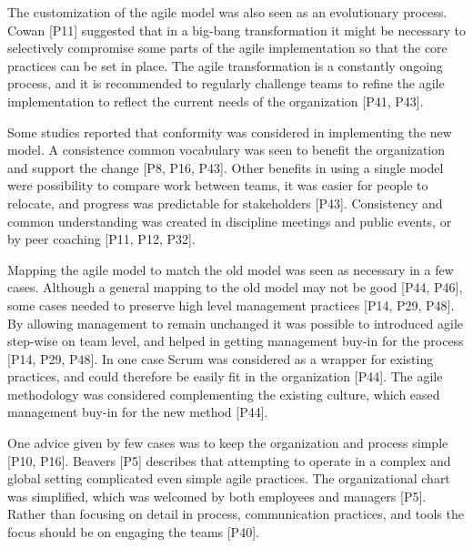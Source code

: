 The customization of the agile model was also seen as an evolutionary process.
Cowan [P11] suggested that in a big-bang transformation it might be necessary to
selectively compromise some parts of the agile implementation so that the core
practices can be set in place.
The agile transformation is a constantly ongoing process, and it is recommended
to regularly challenge teams to refine the agile implementation to reflect the
current needs of the organization [P41, P43].


Some studies reported that conformity was considered in implementing the new
model. A consistence common vocabulary was seen to benefit the organization and
support the change [P8, P16, P43]. Other benefits in using a single model were
possibility to compare work between teams, it was easier for people to relocate,
and progress was predictable for stakeholders [P43]. Consistency and common
understanding was created in discipline meetings and public events, or by peer
coaching [P11, P12, P32].


Mapping the agile model to match the old model was seen as necessary in a few
cases. Although a general mapping to the old model may not be good [P44, P46],
some cases needed to preserve high level management practices [P14, P29, P48].
By allowing management to remain unchanged it was possible to introduced agile
step-wise on team level, and helped in getting management buy-in for the process
[P14, P29, P48].
In one case Scrum was considered as a wrapper for existing practices, and could
therefore be easily fit in the organization [P44]. The agile methodology was
considered complementing the existing culture, which eased management buy-in for
the new method [P44].


One advice given by few cases was to keep the organization and process simple
[P10, P16]. Beavers [P5] describes that attempting to operate in a complex and
global setting complicated even simple agile practices. The organizational chart
was simplified, which was welcomed by both employees and managers [P5]. Rather
than focusing on detail in process, communication practices, and tools the focus
should be on engaging the teams [P40].


